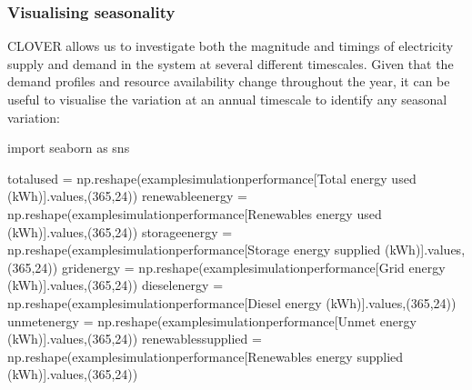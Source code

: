 \documentclass[letterpaper,10pt,english]{sphinxmanual}
\begin{document}
\subsubsection{Visualising seasonality}
\label{\detokenize{energy_system_simulation:visualising-seasonality}}
\sphinxAtStartPar
CLOVER allows us to investigate both the magnitude and timings of
electricity supply and demand in the system at several different
timescales. Given that the demand profiles and resource availability
change throughout the year, it can be useful to visualise the variation
at an annual timescale to identify any seasonal variation:

\begin{sphinxVerbatim}[commandchars=\\\{\}]
import seaborn as sns

total\PYGZus{}used = np.reshape(example\PYGZus{}simulation\PYGZus{}performance[\PYGZsq{}Total energy used (kWh)\PYGZsq{}].values,(365,24))
renewable\PYGZus{}energy = np.reshape(example\PYGZus{}simulation\PYGZus{}performance[\PYGZsq{}Renewables energy used (kWh)\PYGZsq{}].values,(365,24))
storage\PYGZus{}energy = np.reshape(example\PYGZus{}simulation\PYGZus{}performance[\PYGZsq{}Storage energy supplied (kWh)\PYGZsq{}].values,(365,24))
grid\PYGZus{}energy = np.reshape(example\PYGZus{}simulation\PYGZus{}performance[\PYGZsq{}Grid energy (kWh)\PYGZsq{}].values,(365,24))
diesel\PYGZus{}energy = np.reshape(example\PYGZus{}simulation\PYGZus{}performance[\PYGZsq{}Diesel energy (kWh)\PYGZsq{}].values,(365,24))
unmet\PYGZus{}energy = np.reshape(example\PYGZus{}simulation\PYGZus{}performance[\PYGZsq{}Unmet energy (kWh)\PYGZsq{}].values,(365,24))
renewables\PYGZus{}supplied = np.reshape(example\PYGZus{}simulation\PYGZus{}performance[\PYGZsq{}Renewables energy supplied (kWh)\PYGZsq{}].values,(365,24))


\end{sphinxVerbatim}
\end{document}
